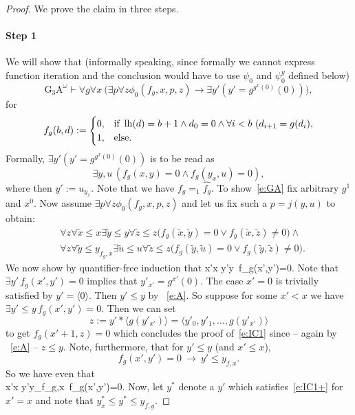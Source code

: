 \begin{proof}
We prove the claim in three steps.
\paragraph{Step 1} We will show that (informally speaking, since 
formally we cannot express function iteration and the conclusion would have to use $\psi_0$ and $\psi^y_0$ defined below)
\[
\mbox{G$_3$A}^\omega\vdash \forall g \forall x\ \big(\exists p\forall z\phi_0(f_g,x,p,z)\rightarrow \exists y'(y'=g^{g^{x}(0)}(0))\big),
\tag{GA}\label{e:GA}
\]
for \[
f_g(b,d):=\begin{cases}
0,&\Tif \ \lh(d) = b+1 \wedge d_0=0\wedge \forall i< b\ (d_{i+1}=g(d_i),\\
1,&\Telse.
\end{cases}
\]
Formally, $\exists y' (y'=g^{g^x(0)}(0))$ is to be read as 
\[ \exists y,u \, (f_g(x,y)=0\wedge f_g(y_x,u)=0),
\tag{GA$^*$}\label{e:GA$^*$} \] 
where then $y':=u_{y_x}.$  
Note that we have $f_g=_1\widehat{f_g}$. To show~\eqref{e:GA} fix arbitrary $g^1$ and $x^0$.
Now assume $\exists p\forall z\phi_0(f_g,x,p,z)$ and let us fix such 
a $p=j(y,u)$ to obtain:
\begin{align}
&\forall z\forall\tilde x \leq x \exists \tilde y\leq y \forall \tilde z\leq z 
\big(f_g(\tilde x,\tilde y)=0\vee f_g(\tilde x,\tilde z)\neq0\big) \label{e:A}
\wedge \\
&\forall z\forall\tilde y \leq y_{f_g,x} \exists \tilde u\leq u \forall \tilde z\leq z 
\big(f_g(\tilde y,\tilde u)=0\vee f_g(\tilde y,\tilde z)\neq0\big). \label {e:B}
\end{align}
We now show by quantifier-free induction that 
\be[e:IC1]
\forall x'\leq x \exists y'\leq y\ f_g(x',y')=0.
\ee
Note that $\exists y'\,f_g(x',y')=0$ implies that $y'_{x'}=g^{x'}(0).$ 
The case $x'=0$ is trivially satisfied by $y'=\langle 0 \rangle$. Then 
$y'\le y$ by ~\eqref{e:A}. So suppose for some $x'<x$ we have
$\exists y'\leq y\,f_g(x',y')=0.$ Then we can set 
\[
z:=y'*\langle g(y'_{x'}) \rangle =\langle y'_0,y'_1,\ldots,g(y'_{x'})\rangle
\] to get $f_g(x'+1,z)=0$
which concludes the proof of~\eqref{e:IC1} since -- again by 
~\eqref{e:A} -- $z\le y.$ Note, furthermore,
that for $y'\leq y$ (and $x'\leq x$),
\[ f_g(x',y')=0\ \rightarrow\ y'\leq y_{f,x}.\] 
So we have even that \\
\be[e:IC1+]
\forall x'\leq x \exists y'\leq y_{f_g,x}\, f_g(x',y')=0.
\ee
Now, let $y^*$ denote a $y'$ which satisfies~\eqref{e:IC1+} for $x'=x$ and 
note that $y^*_x\le y^*\le y_{f,g}.$ 

\end{proof}
